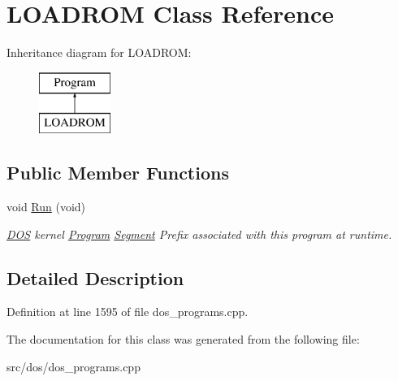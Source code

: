 \hypertarget{classLOADROM}{\section{L\-O\-A\-D\-R\-O\-M Class Reference}
\label{classLOADROM}
}
Inheritance diagram for L\-O\-A\-D\-R\-O\-M\-:\begin{figure}[H]
\begin{center}
\leavevmode
\includegraphics[height=2.000000cm]{classLOADROM}
\end{center}
\end{figure}
\subsection*{Public Member Functions}
\begin{DoxyCompactItemize}
\item 
\hypertarget{classLOADROM_a0d95e173ed8a5de685f6161ade6068f6}{void \hyperlink{classLOADROM_a0d95e173ed8a5de685f6161ade6068f6}{Run} (void)}\label{classLOADROM_a0d95e173ed8a5de685f6161ade6068f6}

\begin{DoxyCompactList}\small\item\em \hyperlink{classDOS}{D\-O\-S} kernel \hyperlink{classProgram}{Program} \hyperlink{structSegment}{Segment} Prefix associated with this program at runtime. \end{DoxyCompactList}\end{DoxyCompactItemize}


\subsection{Detailed Description}


Definition at line 1595 of file dos\-\_\-programs.\-cpp.



The documentation for this class was generated from the following file\-:\begin{DoxyCompactItemize}
\item 
src/dos/dos\-\_\-programs.\-cpp\end{DoxyCompactItemize}

